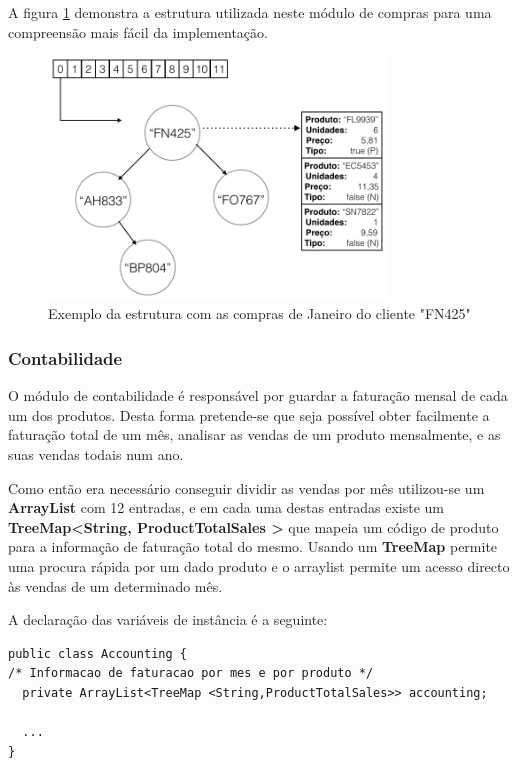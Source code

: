\documentclass[10pt] {article}
\begin{document}
\par A figura \ref{fig:modsales} demonstra a estrutura utilizada neste módulo de compras para uma compreensão mais fácil da implementação.

\begin{figure}[ht!]
\centering
\includegraphics[width=90mm]{sales.png}
\caption{Exemplo da estrutura com as compras de Janeiro do cliente "FN425"}
\label{fig:modsales}
\end{figure}


\subsubsection{Contabilidade\label{contabilidade}}

O módulo de contabilidade é responsável por guardar a faturação mensal de cada um dos produtos.
Desta forma pretende-se que seja possível obter facilmente a faturação total de um mês, analisar as vendas de um produto mensalmente, e as suas vendas todais num ano.

Como então era necessário conseguir dividir as vendas por mês utilizou-se um\color{blue} \textbf{ArrayList} \color{black} com
12 entradas, e em cada uma destas entradas existe um \color{blue} \textbf{TreeMap\textless String, ProductTotalSales
\textgreater} \color{black} que mapeia um código de produto para a informação de faturação total do mesmo.
Usando um \color{blue} \textbf{TreeMap} \color{black} permite uma procura rápida por um dado produto e o arraylist permite um
acesso directo às vendas de um determinado mês.

A declaração das variáveis de instância é a seguinte:

\begin{lstlisting}
public class Accounting {
/* Informacao de faturacao por mes e por produto */
  private ArrayList<TreeMap <String,ProductTotalSales>> accounting;

  ...
}

\end{lstlisting}
\end{document}

